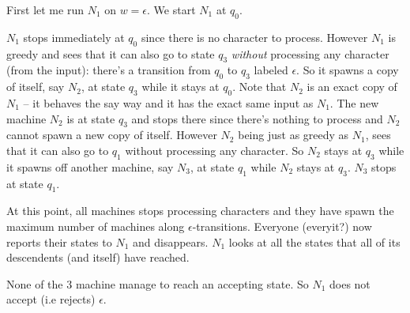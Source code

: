 First let me run $N_1$ on $w = \epsilon$. We start $N_1$ at $q_0$. 
\begin{enumerate}
\li $N_1$ stops immediately at $q_0$ since there is no character to process.
\li However $N_1$ is greedy and sees that it can also go to state $q_3$
\textit{without} processing any character (from the input):
    there's a transition from $q_0$ to $q_3$ labeled $\epsilon$.
    So it spawns a copy of itself, say $N_2$, at state $q_3$ while
    it stays at $q_0$.
    Note that $N_2$ is an exact copy of $N_1$ -- it behaves the say
    way and it has the exact same input as $N_1$. 
    The new machine $N_2$ is at state $q_3$ and stops there since there's
    nothing to process and $N_2$ cannot spawn a new copy of itself.
\li However $N_2$ being just as greedy as $N_1$,
    sees that it can also go to $q_1$ without processing any character.
    So $N_2$ stays at $q_3$ while it spawns off another machine, 
    say $N_3$, at state $q_1$ while $N_2$ stays at $q_3$.
    $N_3$ stops at state $q_1$. 
\end{enumerate}
At this point, all machines stops processing characters and 
they have spawn the maximum number of machines along 
$\epsilon$-transitions. 
Everyone (everyit?) now reports their states to $N_1$ and disappears.
$N_1$ looks at all the states that all of its descendents (and itself) have
reached.

\begin{center}
\end{center}

None of the $3$ machine manage to reach an accepting state.
So $N_1$ does not accept (i.e rejects) $\epsilon$.


